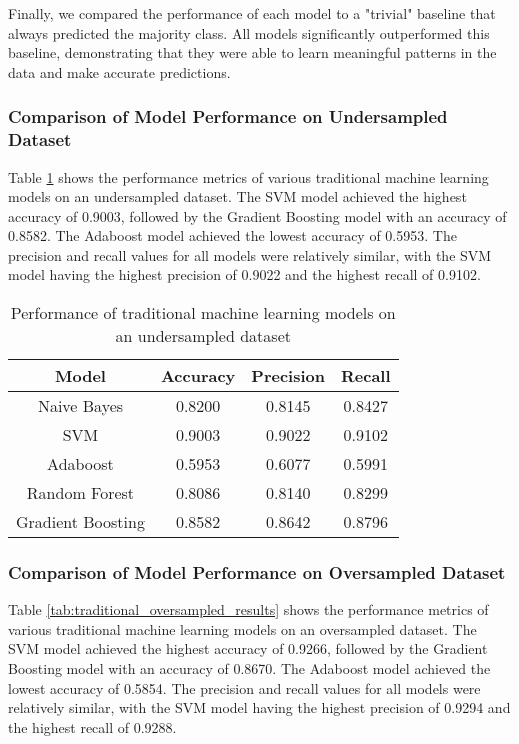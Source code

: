 \documentclass[12pt, a4paper]{article}
\begin{document}
Finally, we compared the performance of each model to a "trivial" baseline that always predicted the majority class. All models significantly outperformed this baseline, demonstrating that they were able to learn meaningful patterns in the data and make accurate predictions.


\subsubsection{Comparison of Model Performance on Undersampled Dataset}

Table \ref{tab:traditional_undersampled_results} shows the performance metrics of various traditional machine learning models on an undersampled dataset. The SVM model achieved the highest accuracy of 0.9003, followed by the Gradient Boosting model with an accuracy of 0.8582. The Adaboost model achieved the lowest accuracy of 0.5953. The precision and recall values for all models were relatively similar, with the SVM model having the highest precision of 0.9022 and the highest recall of 0.9102.

\newline
\begin{center}
\begin{table}[ht]
\centering
\begin{tabular}{|c|c|c|c|}
\hline
\textbf{Model} & \textbf{Accuracy} & \textbf{Precision} & \textbf{Recall} \\
\hline
Naive Bayes & 0.8200 & 0.8145 & 0.8427 \\
SVM & 0.9003 & 0.9022 & 0.9102 \\
Adaboost & 0.5953 & 0.6077 & 0.5991 \\
Random Forest & 0.8086 & 0.8140 & 0.8299 \\
Gradient Boosting & 0.8582 & 0.8642 & 0.8796 \\
\hline
\end{tabular}
\caption{Performance of traditional machine learning models on an undersampled dataset}
\label{tab:traditional_undersampled_results}
\end{table}
\end{center}

\subsubsection{Comparison of Model Performance on Oversampled Dataset}

Table \ref{tab:traditional_oversampled_results} shows the performance metrics of various traditional machine learning models on an oversampled dataset. The SVM model achieved the highest accuracy of 0.9266, followed by the Gradient Boosting model with an accuracy of 0.8670. The Adaboost model achieved the lowest accuracy of 0.5854. The precision and recall values for all models were relatively similar, with the SVM model having the highest precision of 0.9294 and the highest recall of 0.9288.
\end{document}
